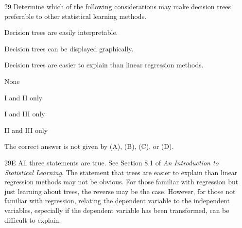 \begin{question}{29}
Determine which of the following considerations may make decision trees preferable to other statistical learning methods.
\begin{statements}
\item Decision trees are easily interpretable.
\item Decision trees can be displayed graphically.
\item Decision trees are easier to explain than linear regression methods.
\end{statements}

\begin{choices}
\item None
\item I and II only
\item I and III only
\item II and III only
\item The correct answer is not given by (A), (B), (C), or (D).
\end{choices}
\end{question}
\begin{solution}{29}{E}
All three statements are true. See Section 8.1 of \textit{An Introduction to Statistical Learning}. The statement that trees are easier to explain than linear regression methods may not be obvious. For those familiar with regression but just learning about trees, the reverse may be the case. However, for those not familiar with regression, relating the dependent variable to the independent variables, especially if the dependent variable has been transformed, can be difficult to explain.
\end{solution}

